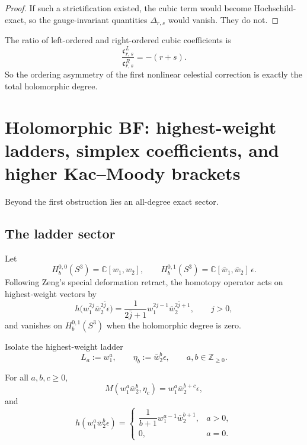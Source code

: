 \begin{proof}
If such a strictification existed, the cubic term would become Hochschild-exact, so the gauge-invariant quantities $\Delta_{r,s}$ would vanish. They do not.
\end{proof}

\begin{corollary}
\label{cor:cbt-asymmetry-law}
\ClaimStatusProvedHere
The ratio of left-ordered and right-ordered cubic coefficients is
\[
\frac{\mathfrak c^L_{r,s}}{\mathfrak c^R_{r,s}}=-(r+s).
\]
So the ordering asymmetry of the first nonlinear celestial correction is exactly the total holomorphic degree.
\end{corollary}

\section{Holomorphic BF: highest-weight ladders, simplex coefficients, and higher Kac--Moody brackets}
\label{sec:cbt-bf-ladders}

Beyond the first obstruction lies an all-degree exact sector.

\subsection{The ladder sector}
\label{sec:cbt-ladder-sector}

Let
\[
H_b^{0,0}(S^3)=\mathbb{C}[w_1,w_2],
\qquad
H_b^{0,1}(S^3)=\mathbb{C}[\bar w_1,\bar w_2]\,\epsilon.
\]
Following Zeng's special deformation retract, the homotopy operator acts on highest-weight vectors by
\[
h\bigl(w_1^{2j}\bar w_2^{2\bar j}\epsilon\bigr)
=
\frac{1}{2\bar j+1}w_1^{2j-1}\bar w_2^{2\bar j+1},
\qquad j>0,
\]
and vanishes on $H_b^{0,1}(S^3)$ when the holomorphic degree is zero.

Isolate the highest-weight ladder
\[
L_a:=w_1^a,
\qquad
\eta_b:=\bar w_2^b\epsilon,
\qquad a,b\in \mathbb Z_{\ge0}.
\]

\begin{lemma}
\label{lem:cbt-ladder-closure-bf}
\ClaimStatusProvedHere
For all $a,b,c\ge0$,
\[
M(w_1^a\bar w_2^b,\eta_c)=w_1^a\bar w_2^{b+c}\epsilon,
\]
and
\[
h(w_1^a\bar w_2^b\epsilon)=
\begin{cases}
\dfrac{1}{b+1}w_1^{a-1}\bar w_2^{b+1}, & a>0,\\[1ex]
0, & a=0.
\end{cases}
\]
\end{lemma}


